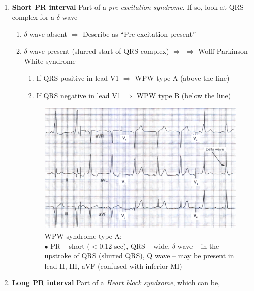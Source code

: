 \documentclass[11pt,a4paper]{report}
\begin{document}
\begin{enumerate}
	\item \textbf{Short PR interval} \textrightarrow Part of a \textit{pre-excitation syndrome}. If so, look at QRS complex for a $\delta$-wave
	\begin{enumerate}
		\item $\delta$-wave absent $\Rightarrow$ Describe as ``Pre-excitation present''
		\item $\delta$-wave present (slurred start of QRS complex) $\Rightarrow$ $\Rightarrow$ Wolff-Parkinson-White syndrome
		\begin{enumerate}
			\item If QRS positive in lead V1 $\Rightarrow$ WPW type A (above the line)
			\item If QRS negative in lead V1 $\Rightarrow$ WPW type B (below the line)
		\end{enumerate}
		\begin{figure}[htp]
			\centering \includegraphics[scale=1.0]{ecg-wpw-a.png}
			\centering \caption[WPW syndrome type A]{WPW syndrome type A; \\$\bullet$ PR -- short ($<$0.12 sec), QRS -- wide, $\delta$ wave -- in the upstroke of QRS (slurred QRS), Q wave -- may be present in lead II, III, aVF (confused with inferior MI) \cite{abdullah-ecg}}
			\label{ECG-wpw-a}
		\end{figure}
	\end{enumerate}
	\item \textbf{Long PR interval} \textrightarrow Part of a \textit{Heart block syndrome}, which can be, 
	\begin{enumerate}

\end{enumerate}
\end{enumerate}
\end{document}
